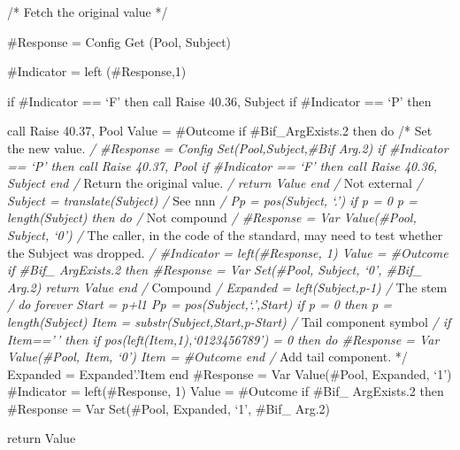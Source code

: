 /* Fetch the original value */

\#Response = Config Get (Pool, Subject)

\#Indicator = left (\#Response,1)

if \#Indicator == `F' then call Raise 40.36, Subject if \#Indicator ==
`P' then

call Raise 40.37, Pool Value = \#Outcome if \#Bif\_ArgExists.2 then do
/* Set the new value. \emph{/ \#Response = Config Set(Pool,Subject,\#Bif
Arg.2) if \#Indicator == `P' then call Raise 40.37, Pool if \#Indicator
== `F' then call Raise 40.36, Subject end /} Return the original value.
\emph{/ return Value end /} Not external \emph{/ Subject =
translate(Subject) /} See nnn \emph{/ Pp = pos(Subject, `.') if p = 0
\textbar{} p = length(Subject) then do /} Not compound \emph{/
\#Response = Var Value(\#Pool, Subject, `0') /} The caller, in the code
of the standard, may need to test whether the Subject was dropped.
\emph{/ \#Indicator = left(\#Response, 1) Value = \#Outcome if \#Bif\_
ArgExists.2 then \#Response = Var Set(\#Pool, Subject, `0', \#Bif\_
Arg.2) return Value end /} Compound \emph{/ Expanded = left(Subject,p-1)
/} The stem \emph{/ do forever Start = p+l1 Pp = pos(Subject,`.',Start)
if p = 0 then p = length(Subject) Item = substr(Subject,Start,p-Start)
/} Tail component symbol \emph{/ if Item=='\,' then if
pos(left(Item,1),`0123456789') = 0 then do \#Response = Var
Value(\#Pool, Item, `0') Item = \#Outcome end /} Add tail component. */
Expanded = Expanded'.'Item end \#Response = Var Value(\#Pool, Expanded,
`1') \#Indicator = left(\#Response, 1) Value = \#Outcome if \#Bif\_
ArgExists.2 then \#Response = Var Set(\#Pool, Expanded, `1', \#Bif\_
Arg.2)

return Value
